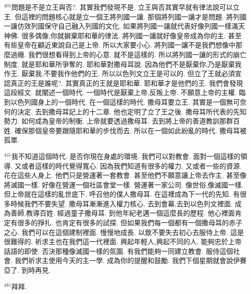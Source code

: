 \documentclass{book}
\begin{document}
$^{401}$問題是不是立王與否?.
其實我們發現不是.
立王與否其實早就有律法說可以立王.
但這裡的問題核心就是立一個王將列國一讓.
那個將列國一讓才是問題.
將列國一讓仿效列國保守自己融入列國的文化.
如果將列國一讓就代表好像列國一樣滿天神佛.
很多偶像,你就摒棄耶和華的律法.
將列國一讓就好像皇帝成為你的主.
甚至有些皇帝在顧近東說自己是上帝.
所以大家要小心.
將列國一讓不是我們想像中那麼過癮.
我們很想看得到上帝的心意.
就不是這樣的.
所以將列國一讓的形式的崩亡制度.
就是耶和華所爭奪的.
耶和華對撒母耳說.
因為他們不是厭棄你,乃是厭棄我作王.
厭棄我,不要我作他們的王.
所以以色列文立王是可以的.
但立了王就必須宣認真正的王是誰呢?.
其實真正的王就是耶和華.
耶和華才是他們的王.
我們會發現這段經文.
就闡述一個時代.
一個時代是厭棄上帝,反叛上帝.
不願意上帝的主權.
臨到以色列國身上的一個時代.
在一個這樣的時代.
撒母耳要立王.
其實是一個無可奈何的決定.
去到撒母耳記上的十二章.
他也定明了立了王之後.
撒母耳所代表的先知勢力.
如何成為皇帝的制衡.
上帝就要透過撒母耳.
去到將上帝的善道教訓那群百姓.
確保那個皇帝要跟隨耶和華的步伐而去.
所以在一個如此紛亂的時代.
撒母耳被孤單.

$^{441}$我不知道這個時代.
是否你現在身處的環境.
我們可以對教會.
面對一個這樣的領導.
又或者這樣的時代覺得寬心.
因為我們知道有很多的權力.
又或者一些的資源.
花在這些人身上.
他們只是營運著一套教會.
甚至他們不願意讓上帝去作主.
甚至像將滅國一樣.
好像在營運一個社區會堂一樣.
營運著一家公司.
像世俗,像滅國一樣.
但上帝就在這樣的亂世底下.
呼召他的僕人撒母耳.
在這裡成為下一代的先知.
有很多時候我們不要失望.
撒母耳漸漸進入權力核心.
去到會幕,去到以色列文裡面.
成為善師,教導百姓.
經過童子撒母耳.
到他年紀老邁一個這麼長的歷程.
他心裡面肯定有很多的掙扎.
也肯定有很多的試探.
但如果我們每一個都有一個撒母耳的赤子之心.
我們可以在這個建制裡面.
慢慢地成長.
以致不要失去初心去服侍上帝.
這是很難得的.
祈求主也在我們這一代裡面.
興起年輕人,興起不同的人.
能夠忠於上帝話語的即使.
否決那種像滅國一樣的氛圍.
有我們能夠一同建立教會.
服侍這個社會.
我們祈求主使用今天的主一學.
成為你的提醒和鼓勵.
我們下個星期就會說伊賽亞了.
到時再見.

$^{481}$拜拜.
\newpage
\end{document}
